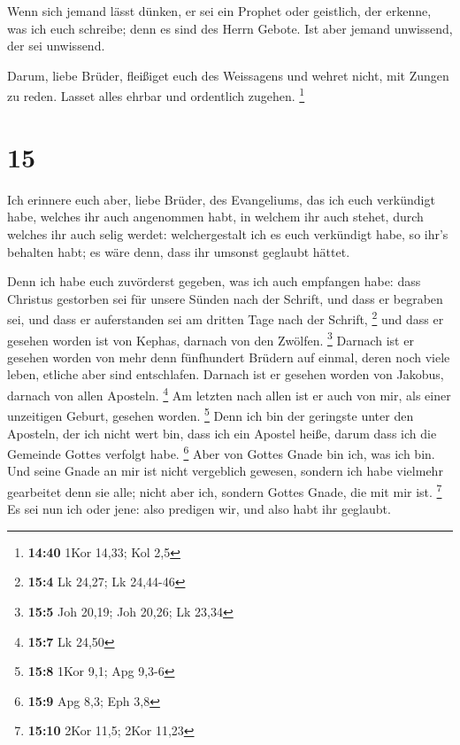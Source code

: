  Wenn sich jemand lässt dünken, er sei ein Prophet oder
geistlich, der erkenne, was ich euch schreibe; denn es sind des Herrn
Gebote.  Ist aber jemand unwissend, der sei unwissend.

 Darum, liebe Brüder, fleißiget euch des Weissagens und
wehret nicht, mit Zungen zu reden.  Lasset alles ehrbar
und ordentlich zugehen. \footnote{\textbf{14:40} 1Kor 14,33; Kol 2,5}

\hypertarget{section-9}{%
\section{15}\label{section-9}}

 Ich erinnere euch aber, liebe Brüder, des Evangeliums,
das ich euch verkündigt habe, welches ihr auch angenommen habt, in
welchem ihr auch stehet,  durch welches ihr auch selig
werdet: welchergestalt ich es euch verkündigt habe, so ihr's behalten
habt; es wäre denn, dass ihr umsonst geglaubt hättet.

 Denn ich habe euch zuvörderst gegeben, was ich auch
empfangen habe: dass Christus gestorben sei für unsere Sünden nach der
Schrift,  und dass er begraben sei, und dass er
auferstanden sei am dritten Tage nach der Schrift, \footnote{\textbf{15:4}
  Lk 24,27; Lk 24,44-46}  und dass er gesehen worden ist
von Kephas, darnach von den Zwölfen. \footnote{\textbf{15:5} Joh 20,19;
  Joh 20,26; Lk 23,34}  Darnach ist er gesehen worden von
mehr denn fünfhundert Brüdern auf einmal, deren noch viele leben,
etliche aber sind entschlafen.  Darnach ist er gesehen
worden von Jakobus, darnach von allen Aposteln. \footnote{\textbf{15:7}
  Lk 24,50}  Am letzten nach allen ist er auch von mir,
als einer unzeitigen Geburt, gesehen worden. \footnote{\textbf{15:8}
  1Kor 9,1; Apg 9,3-6}  Denn ich bin der geringste unter
den Aposteln, der ich nicht wert bin, dass ich ein Apostel heiße, darum
dass ich die Gemeinde Gottes verfolgt habe. \footnote{\textbf{15:9} Apg
  8,3; Eph 3,8}  Aber von Gottes Gnade bin ich, was ich
bin. Und seine Gnade an mir ist nicht vergeblich gewesen, sondern ich
habe vielmehr gearbeitet denn sie alle; nicht aber ich, sondern Gottes
Gnade, die mit mir ist. \footnote{\textbf{15:10} 2Kor 11,5; 2Kor 11,23}
 Es sei nun ich oder jene: also predigen wir, und also
habt ihr geglaubt.

